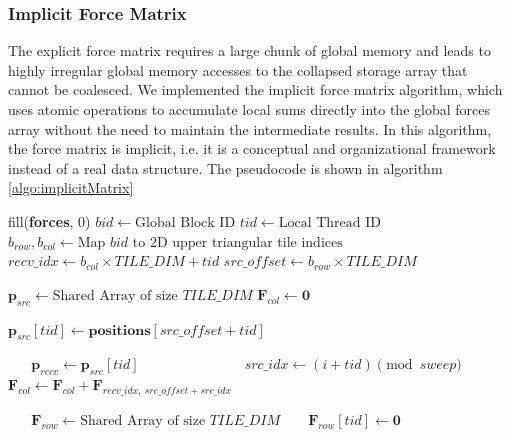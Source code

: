 \documentclass[12pt]{article}
\begin{document}
\subsubsection{Implicit Force Matrix}
The explicit force matrix requires a large chunk of global memory and leads to highly irregular global memory accesses to the collapsed storage array that cannot be coalesced. We implemented the implicit force matrix algorithm, which uses atomic operations to accumulate local sums directly into the global forces array without the need to maintain the intermediate results. In this algorithm, the force matrix is implicit, i.e. it is a conceptual and organizational framework instead of a real data structure. The pseudocode is shown in algorithm \ref{algo:implicitMatrix}

\begin{algorithm}
\caption{Implicit Force Matrix} \label{algo:implicitMatrix}
\begin{algorithmic}[1]
\State fill(\textbf{forces}, 0)
\State $bid \gets \text{Global Block ID}$
\State $tid \gets \text{Local Thread ID}$
\State $b_{row}, b_{col} \gets \text{Map } bid \text{ to 2D upper triangular tile indices}$
\State $recv\_idx \gets b_{col} \times TILE\_DIM + tid$
\State $src\_offset \gets b_{row} \times TILE\_DIM$

\State $\mathbf{p}_{src} \gets \text{Shared Array of size } TILE\_DIM$ 
\State $\mathbf{F}_{col} \gets \mathbf{0}$ 

\State $\mathbf{p}_{src}[tid] \gets \mathbf{positions}[src\_offset + tid]$
\State {}

 
    \State $\mathbf{p}_{recv} \gets \mathbf{p}_{src}[tid]$ 
    
     
        \State $src\_idx \gets (i + tid) \pmod{sweep}$ 
        \State $\mathbf{F}_{col} \gets \mathbf{F}_{col} + \mathbf{F}_{recv\_idx, \ src\_offset + src\_idx}$
    \EndFor
    \State {}

\Else {}
    \State $\mathbf{F}_{row} \gets \text{Shared Array of size } TILE\_DIM$ 
    \State $\mathbf{F}_{row}[tid] \gets \mathbf{0}$
    \State {}


\end{algorithmic}
\end{algorithm}
\end{document}
